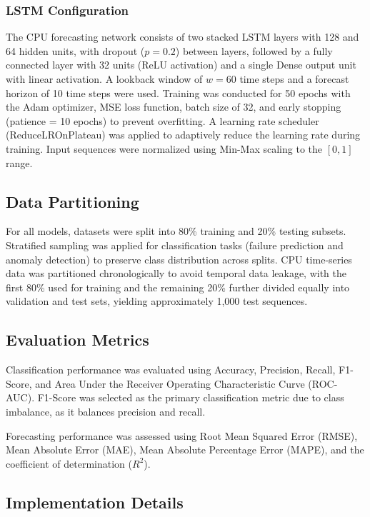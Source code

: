 \documentclass[a4paper,fleqn]{cas-dc}
\begin{document}
\subsubsection{LSTM Configuration}
The CPU forecasting network consists of two stacked LSTM layers with 128 and 64 hidden units, with dropout ($p=0.2$) between layers, followed by a fully connected layer with 32 units (ReLU activation) and a single Dense output unit with linear activation.
A lookback window of $w = 60$ time steps and a forecast horizon of 10 time steps were used.
Training was conducted for 50 epochs with the Adam optimizer, MSE loss function, batch size of 32, and early stopping (patience = 10 epochs) to prevent overfitting.
A learning rate scheduler (ReduceLROnPlateau) was applied to adaptively reduce the learning rate during training.
Input sequences were normalized using Min-Max scaling to the $[0, 1]$ range.

\subsection{Data Partitioning}\label{subsec:partition}

For all models, datasets were split into 80\% training and 20\% testing subsets.
Stratified sampling was applied for classification tasks (failure prediction and anomaly detection) to preserve class distribution across splits.
CPU time-series data was partitioned chronologically to avoid temporal data leakage, with the first 80\% used for training and the remaining 20\% further divided equally into validation and test sets, yielding approximately 1,000 test sequences.

\subsection{Evaluation Metrics}\label{subsec:metrics}

Classification performance was evaluated using Accuracy, Precision, Recall, F1-Score, and Area Under the Receiver Operating Characteristic Curve (ROC-AUC).
F1-Score was selected as the primary classification metric due to class imbalance, as it balances precision and recall.


Forecasting performance was assessed using Root Mean Squared Error (RMSE), Mean Absolute Error (MAE), Mean Absolute Percentage Error (MAPE), and the coefficient of determination ($R^2$).


\subsection{Implementation Details}\label{subsec:implementation}
\end{document}

